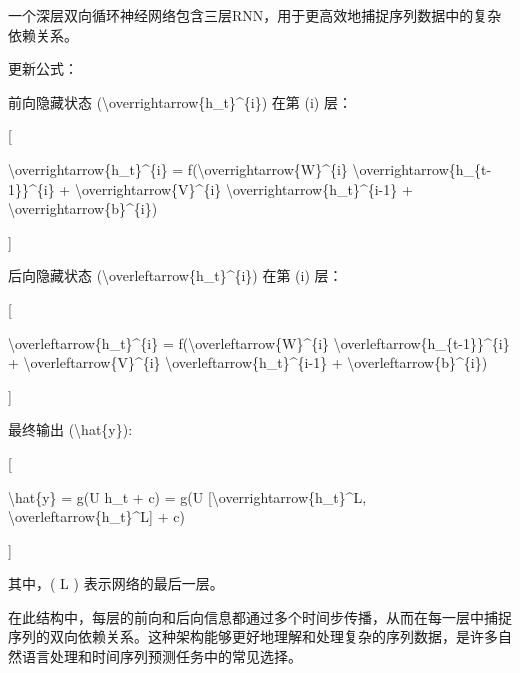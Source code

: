 一个深层双向循环神经网络包含三层RNN，用于更高效地捕捉序列数据中的复杂依赖关系。


更新公式：

前向隐藏状态 (\textbackslash overrightarrow\{h\_t\}\^{}\{i\}) 在第 (i)
层：

{[}

\textbackslash overrightarrow\{h\_t\}\^{}\{i\} =
f(\textbackslash overrightarrow\{W\}\^{}\{i\}
\textbackslash overrightarrow\{h\_\{t-1\}\}\^{}\{i\} +
\textbackslash overrightarrow\{V\}\^{}\{i\}
\textbackslash overrightarrow\{h\_t\}\^{}\{i-1\} +
\textbackslash overrightarrow\{b\}\^{}\{i\})

{]}


后向隐藏状态 (\textbackslash overleftarrow\{h\_t\}\^{}\{i\}) 在第 (i)
层：

{[}

\textbackslash overleftarrow\{h\_t\}\^{}\{i\} =
f(\textbackslash overleftarrow\{W\}\^{}\{i\}
\textbackslash overleftarrow\{h\_\{t-1\}\}\^{}\{i\} +
\textbackslash overleftarrow\{V\}\^{}\{i\}
\textbackslash overleftarrow\{h\_t\}\^{}\{i-1\} +
\textbackslash overleftarrow\{b\}\^{}\{i\})

{]}


最终输出 (\textbackslash hat\{y\}):

{[}

\textbackslash hat\{y\} = g(U h\_t + c) = g(U
{[}\textbackslash overrightarrow\{h\_t\}\^{}L,
\textbackslash overleftarrow\{h\_t\}\^{}L{]} + c)

{]}

其中，( L ) 表示网络的最后一层。


在此结构中，每层的前向和后向信息都通过多个时间步传播，从而在每一层中捕捉序列的双向依赖关系。这种架构能够更好地理解和处理复杂的序列数据，是许多自然语言处理和时间序列预测任务中的常见选择。

